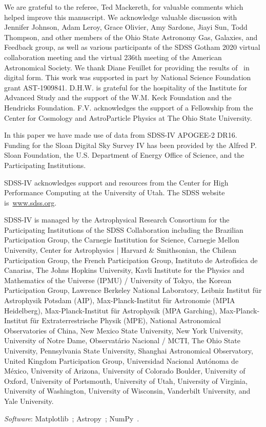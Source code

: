 \documentclass[draft2.tex]{subfiles}
\begin{document}
{\color{red} 
We are grateful to the referee, Ted Mackereth, for valuable comments which 
helped improve this manuscript. 
} 
We acknowledge valuable discussion with Jennifer Johnson, Adam Leroy, Grace 
Olivier, Amy Sardone, Jiayi Sun, Todd Thompson, and other members of the Ohio 
State Astronomy Gas, Galaxies, and Feedback group, as well as various 
participants of the SDSS Gotham 2020 virtual collaboration meeting and the 
virtual 236th meeting of the American Astronomical Society. 
We thank Diane Feuillet for providing the results of~\citet{Feuillet2019} in 
digital form. 
This work was supported in part by National Science Foundation grant 
AST-1909841. 
D.H.W. is grateful for the hospitality of the Institute for Advanced Study and 
the support of the W.M. Keck Foundation and the Hendricks Foundation. 
F.V. acknowledges the support of a Fellowship from the Center for Cosmology and 
AstroParticle Physics at The Ohio State University. 
\par 
In this paper we have made use of data from SDSS-IV APOGEE-2 DR16. 
Funding for the Sloan Digital Sky 
Survey IV has been provided by the 
Alfred P. Sloan Foundation, the U.S. 
Department of Energy Office of 
Science, and the Participating 
Institutions. 
\par 
SDSS-IV acknowledges support and 
resources from the Center for High 
Performance Computing  at the 
University of Utah. The SDSS 
website is~\url{www.sdss.org}.
\par 
SDSS-IV is managed by the 
Astrophysical Research Consortium 
for the Participating Institutions 
of the SDSS Collaboration including 
the Brazilian Participation Group, 
the Carnegie Institution for Science, 
Carnegie Mellon University, Center for 
Astrophysics | Harvard \& 
Smithsonian, the Chilean Participation 
Group, the French Participation Group, 
Instituto de Astrof\'isica de 
Canarias, The Johns Hopkins 
University, Kavli Institute for the 
Physics and Mathematics of the 
Universe (IPMU) / University of 
Tokyo, the Korean Participation Group, 
Lawrence Berkeley National Laboratory, 
Leibniz Institut f\"ur Astrophysik 
Potsdam (AIP),  Max-Planck-Institut 
f\"ur Astronomie (MPIA Heidelberg), 
Max-Planck-Institut f\"ur 
Astrophysik (MPA Garching), 
Max-Planck-Institut f\"ur 
Extraterrestrische Physik (MPE), 
National Astronomical Observatories of 
China, New Mexico State University, 
New York University, University of 
Notre Dame, Observat\'ario 
Nacional / MCTI, The Ohio State 
University, Pennsylvania State 
University, Shanghai 
Astronomical Observatory, United 
Kingdom Participation Group, 
Universidad Nacional Aut\'onoma 
de M\'exico, University of Arizona, 
University of Colorado Boulder, 
University of Oxford, University of 
Portsmouth, University of Utah, 
University of Virginia, University 
of Washington, University of 
Wisconsin, Vanderbilt University, 
and Yale University.

\textit{Software}: Matplotlib~\citep{Matplotlib}; Astropy~\citep{Astropy2013, 
Astropy2018}; NumPy~\citep{NumPy}. 
\end{document}
